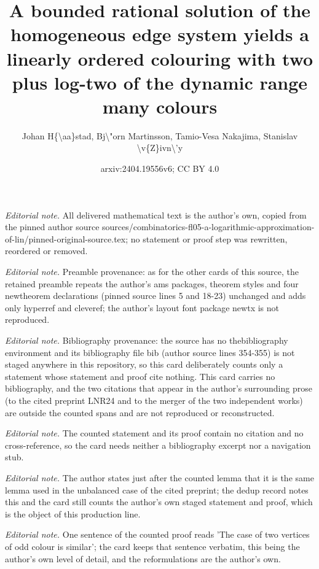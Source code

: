 \documentclass[10pt,a4paper]{article}
\title{A bounded rational solution of the homogeneous edge system yields a linearly ordered colouring with two plus log-two of the dynamic range many colours}
\author{Johan H\{\textbackslash{}aa\}stad, Bj\textbackslash{}"orn Martinsson, Tamio-Vesa Nakajima, Stanislav \textbackslash{}v\{Z\}ivn\textbackslash{}'y}
\date{arxiv:2404.19556v6; CC BY 4.0}
\theoremstyle{plain}
\theoremstyle{definition}
\begin{document}
\maketitle
\noindent\textit{Editorial note.} All delivered mathematical text is the author's own, copied from the pinned author source sources/combinatorics-fl05-a-logarithmic-approximation-of-lin/pinned-original-source.tex; no statement or proof step was rewritten, reordered or removed.\par\medskip
\noindent\textit{Editorial note.} Preamble provenance: as for the other cards of this source, the retained preamble repeats the author's ams packages, theorem styles and four newtheorem declarations (pinned source lines 5 and 18-23) unchanged and adds only hyperref and cleveref; the author's layout font package newtx is not reproduced.\par\medskip
\noindent\textit{Editorial note.} Bibliography provenance: the source has no thebibliography environment and its bibliography file bib (author source lines 354-355) is not staged anywhere in this repository, so this card deliberately counts only a statement whose statement and proof cite nothing. This card carries no bibliography, and the two citations that appear in the author's surrounding prose (to the cited preprint LNR24 and to the merger of the two independent works) are outside the counted spans and are not reproduced or reconstructed.\par\medskip
\noindent\textit{Editorial note.} The counted statement and its proof contain no citation and no cross-reference, so the card needs neither a bibliography excerpt nor a navigation stub.\par\medskip
\noindent\textit{Editorial note.} The author states just after the counted lemma that it is the same lemma used in the unbalanced case of the cited preprint; the dedup record notes this and the card still counts the author's own staged statement and proof, which is the object of this production line.\par\medskip
\noindent\textit{Editorial note.} One sentence of the counted proof reads 'The case of two vertices of odd colour is similar'; the card keeps that sentence verbatim, this being the author's own level of detail, and the reformulations are the author's own.\par\medskip
\end{document}
